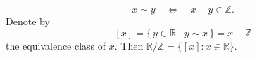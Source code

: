 \documentclass[11pt,openany]{article}
\begin{document}
\[
x \sim y \quad \Longleftrightarrow \quad x-y \in \mathbb{Z}.
\]
Denote by
\[
[x] = \{\, y \in \mathbb{R} \mid y \sim x \,\} = x + \mathbb{Z}
\]
the equivalence class of \(x\). Then $\mathbb{R}/\mathbb{Z} = \{ [x] : x \in \mathbb{R} \}.$
%
%
%
%
%
%
%
%
\end{document}
